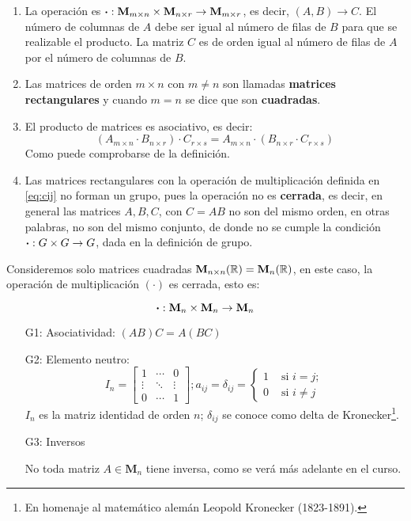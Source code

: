 \begin{enumerate}[label=\roman*)]
	\item La operación es $\boldsymbol{\cdot} : \textbf{M}_{m \times n} \times \mathbf{M}_{n \times r} \rightarrow \mathbf{M}_{m \times r}$, es decir, $(A, B) \rightarrow C$. El número de columnas de $A$ debe ser igual al número de filas de $B$ para que se realizable el producto. La matriz $C$ es de orden igual al número de filas de $A$ por el número de columnas de $B$.
	
	\item Las matrices de orden $m\times n$ con $m \ne n$ son llamadas \textbf{matrices rectangulares} y cuando $m = n$ se dice que son \textbf{cuadradas}.
	
	\item El producto de matrices es asociativo, es decir: \[(A_{m\times n} \cdot B_{n \times r}) \cdot C_{r \times s} = A_{m \times n} \cdot (B_{n \times r} \cdot C_{r \times s})\] Como puede comprobarse de la definición.
	
	\item Las matrices rectangulares con la operación de multiplicación definida en \eqref{eq:cij} no forman un grupo, pues la operación no es \textbf{cerrada}, es decir, en general las matrices $A, B, C$, con $C = AB$ no son del mismo orden, en otras palabras, no son del mismo conjunto, de donde no se cumple la condición $\boldsymbol{\cdot}: G \times G \rightarrow G$, dada en la definición de grupo.
\end{enumerate}

Consideremos solo matrices cuadradas $\mathbf{M}_{n \times n}(\mathbb{R}) = \mathbf{M}_n(\mathbb{R})$, en este caso, la operación de multiplicación $(\cdot)$ es cerrada, esto es:

\[ \boldsymbol{\cdot}: \mathbf{M}_n \times \mathbf{M}_n \rightarrow \mathbf{M}_n\]

\begin{itemize}
	\item[G1:] Asociatividad: $(AB)C = A(BC)$ \quad \cmark
	\item[G2:] Elemento neutro: \quad \cmark
	\[I_n = \begin{bmatrix}
		1 & \cdots & 0\\
		\vdots & \ddots & \vdots\\
		0 & \cdots & 1 
	\end{bmatrix}; a_{ij} = \delta_{ij} = \begin{cases} 1 & \mbox{ si } i = j;\\ 0 & \mbox{ si } i \ne j \end{cases} \] $I_n$ es la matriz identidad de orden $n$; $\delta_{ij}$ se conoce como delta de Kronecker\footnote{En homenaje al matemático alemán Leopold Kronecker (1823-1891).}.
	\item[G3:] Inversos \quad \xmark
	
	No toda matriz $A \in \mathbf{M}_n$ tiene inversa, como se verá más adelante en el curso.
\end{itemize}

